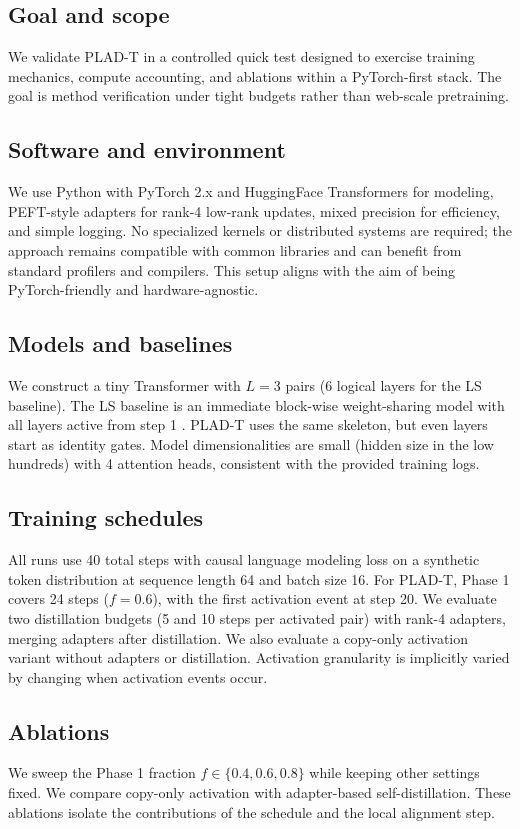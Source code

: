 \documentclass{article}
\begin{document}
\subsection{Goal and scope}
We validate PLAD-T in a controlled quick test designed to exercise training mechanics, compute accounting, and ablations within a PyTorch-first stack. The goal is method verification under tight budgets rather than web-scale pretraining.

\subsection{Software and environment}
We use Python with PyTorch 2.x and HuggingFace Transformers for modeling, PEFT-style adapters for rank-4 low-rank updates, mixed precision for efficiency, and simple logging. No specialized kernels or distributed systems are required; the approach remains compatible with common libraries and can benefit from standard profilers and compilers. This setup aligns with the aim of being PyTorch-friendly and hardware-agnostic.

\subsection{Models and baselines}
We construct a tiny Transformer with \(L = 3\) pairs (6 logical layers for the LS baseline). The LS baseline is an immediate block-wise weight-sharing model with all layers active from step 1 \cite{liu-2024-mobilellm}. PLAD-T uses the same skeleton, but even layers start as identity gates. Model dimensionalities are small (hidden size in the low hundreds) with 4 attention heads, consistent with the provided training logs.

\subsection{Training schedules}
All runs use 40 total steps with causal language modeling loss on a synthetic token distribution at sequence length 64 and batch size 16. For PLAD-T, Phase 1 covers 24 steps (\(f = 0.6\)), with the first activation event at step 20. We evaluate two distillation budgets (5 and 10 steps per activated pair) with rank-4 adapters, merging adapters after distillation. We also evaluate a copy-only activation variant without adapters or distillation. Activation granularity is implicitly varied by changing when activation events occur.

\subsection{Ablations}
We sweep the Phase 1 fraction \(f \in \{0.4, 0.6, 0.8\}\) while keeping other settings fixed. We compare copy-only activation with adapter-based self-distillation. These ablations isolate the contributions of the schedule and the local alignment step.
\end{document}
